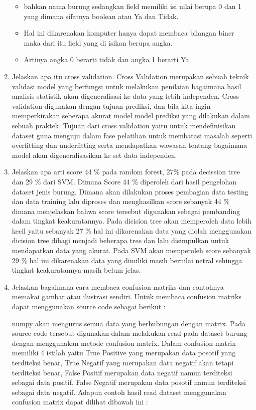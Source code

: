 \begin{enumerate}
\begin{itemize}
		\item bahkan nama burung sedangkan field memiliki isi nilai berupa 0 dan 1 yang dimana sifatnya boolean atau Ya dan Tidak.

		\item Hal ini dikarenakan komputer hanya dapat membaca bilangan biner maka dari itu field yang di isikan berupa angka.

		\item Artinya angka 0 berarti tidak dan angka 1 berarti Ya.
	\end{itemize}
	
	\item Jelaskan apa itu cross validation.
	\hfill\break
	Cross Validation merupakan sebuah teknik validasi model yang berfungsi untuk melakukan penilaian bagaimana hasil analisis statistik akan digeneralisasi ke data yang lebih independen. Cross validation digunakan dengan tujuan prediksi, dan bila kita ingin memperkirakan seberapa akurat model model prediksi yang dilakukan dalam sebuah praktek. Tujuan dari cross validation yaitu untuk mendefinisikan dataset guna menguju dalam fase pelatihan untuk membatasi masalah seperti overfitting dan underfitting serta mendapatkan wawasan tentang bagaimana model akan digeneralisasikan ke set data independen.

	\item Jelaskan apa arti score 44 \% pada random forest, 27\% pada decission tree dan 29 \% dari SVM.
	\hfill\break
	Dimana Score 44 \% diperoleh dari hasil pengelohan dataset jenis burung. Dimana akan dilakukan proses pembagian data testing dan data training lalu diproses dan menghasilkan score sebanyak 44 \% dimana menjelaskan bahwa score tersebut digunakan sebagai pembanding dalam tingkat keakuratannya. Pada dicision tree akan memperoleh data lebih kecil yaitu sebanyak 27 \% hal ini dikarenakan data yang diolah menggunakan dicision tree dibagi menjadi beberapa tree dan lalu disimpulkan untuk mendapatkan data yang akurat. Pada SVM akan memperoleh score sebanyak 29 \% hal ini dikarenakan data yang dimiliki masih bernilai netral sehingga tingkat keakuratannya masih belum jelas.

	\item Jelaskan bagaimana cara membaca confusion matriks dan contohnya memakai gambar atau ilustrasi sendiri.
	\hfill\break
	Untuk membaca confusion matriks dapat menggunakan source code sebagai berikut :
	
	\hfill\break
	numpy akan mengurus semua data yang berhubungan dengan matrix. Pada source code tersebut digunakan dalam melakukan read pada dataset burung dengan menggunakan metode confusion matrix. Dalam confusion matrix memiliki 4 istilah yaitu True Positive yang merupakan data posotif yang terditeksi benar, True Negatif yang merupakan data negatif akan tetapi terditeksi benar, False Positif merupakan data negatif namun terditeksi sebagai data positif, False Negatif merupakan data posotif namun terditeksi sebagai data negatif. Adapun contoh hasil read dataset menggunakan confusion matrix dapat dilihat dibawah ini :


\end{enumerate}
